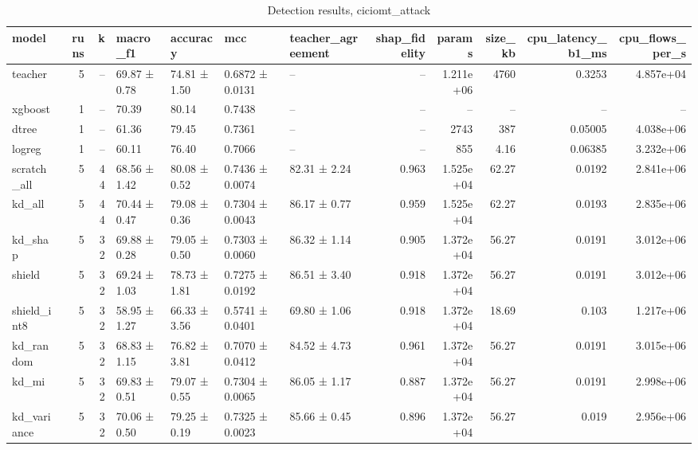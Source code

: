 \begin{table}
\caption{Detection results, ciciomt_attack}
\begin{tabular}{lrrllllrrrrr}
\toprule
model & runs & k & macro_f1 & accuracy & mcc & teacher_agreement & shap_fidelity & params & size_kb & cpu_latency_b1_ms & cpu_flows_per_s \\
\midrule
teacher & 5 & -- & 69.87 ± 0.78 & 74.81 ± 1.50 & 0.6872 ± 0.0131 & -- & -- & 1.211e+06 & 4760 & 0.3253 & 4.857e+04 \\
xgboost & 1 & -- & 70.39 & 80.14 & 0.7438 & -- & -- & -- & -- & -- & -- \\
dtree & 1 & -- & 61.36 & 79.45 & 0.7361 & -- & -- & 2743 & 387 & 0.05005 & 4.038e+06 \\
logreg & 1 & -- & 60.11 & 76.40 & 0.7066 & -- & -- & 855 & 4.16 & 0.06385 & 3.232e+06 \\
scratch_all & 5 & 44 & 68.56 ± 1.42 & 80.08 ± 0.52 & 0.7436 ± 0.0074 & 82.31 ± 2.24 & 0.963 & 1.525e+04 & 62.27 & 0.0192 & 2.841e+06 \\
kd_all & 5 & 44 & 70.44 ± 0.47 & 79.08 ± 0.36 & 0.7304 ± 0.0043 & 86.17 ± 0.77 & 0.959 & 1.525e+04 & 62.27 & 0.0193 & 2.835e+06 \\
kd_shap & 5 & 32 & 69.88 ± 0.28 & 79.05 ± 0.50 & 0.7303 ± 0.0060 & 86.32 ± 1.14 & 0.905 & 1.372e+04 & 56.27 & 0.0191 & 3.012e+06 \\
shield & 5 & 32 & 69.24 ± 1.03 & 78.73 ± 1.81 & 0.7275 ± 0.0192 & 86.51 ± 3.40 & 0.918 & 1.372e+04 & 56.27 & 0.0191 & 3.012e+06 \\
shield_int8 & 5 & 32 & 58.95 ± 1.27 & 66.33 ± 3.56 & 0.5741 ± 0.0401 & 69.80 ± 1.06 & 0.918 & 1.372e+04 & 18.69 & 0.103 & 1.217e+06 \\
kd_random & 5 & 32 & 68.83 ± 1.15 & 76.82 ± 3.81 & 0.7070 ± 0.0412 & 84.52 ± 4.73 & 0.961 & 1.372e+04 & 56.27 & 0.0191 & 3.015e+06 \\
kd_mi & 5 & 32 & 69.83 ± 0.51 & 79.07 ± 0.55 & 0.7304 ± 0.0065 & 86.05 ± 1.17 & 0.887 & 1.372e+04 & 56.27 & 0.0191 & 2.998e+06 \\
kd_variance & 5 & 32 & 70.06 ± 0.50 & 79.25 ± 0.19 & 0.7325 ± 0.0023 & 85.66 ± 0.45 & 0.896 & 1.372e+04 & 56.27 & 0.019 & 2.956e+06 \\
\bottomrule
\end{tabular}
\end{table}
